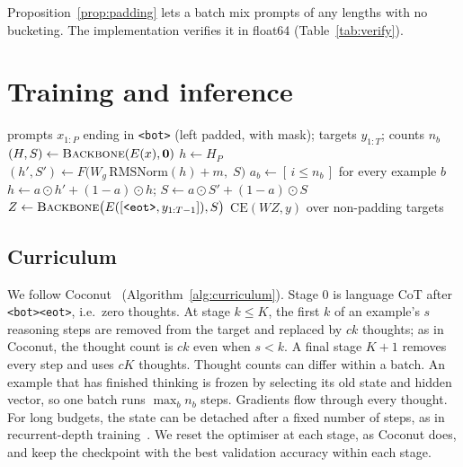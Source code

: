 \documentclass[10pt]{article}
\newcommand{\eot}{\texttt{<eot>}}
\renewcommand{\bot}{\texttt{<bot>}}
\begin{document}
Proposition~\ref{prop:padding} lets a batch mix prompts of any lengths with no bucketing. The implementation verifies it in float64 (Table~\ref{tab:verify}).

\section{Training and inference}

\begin{algorithm}[t]
\caption{Curriculum loss with per-example thought counts}
\label{alg:curriculum}
\begin{algorithmic}[1]
\Require prompts $x_{1:P}$ ending in \bot{} (left padded, with mask); targets $y_{1:T}$; counts $n_b$
\State $(H, S) \gets \textsc{Backbone}(E(x), \mathbf{0})$ 
\State $h \gets H_P$ \Comment{hidden state at \bot}
  \State $(h', S') \gets F\big(W_g\,\mathrm{RMSNorm}(h) + m,\; S\big)$ 
  \State $a_b \gets [\,i \le n_b\,]$ for every example $b$
  \State $h \gets a \odot h' + (1-a)\odot h$; \quad $S \gets a \odot S' + (1-a)\odot S$
\EndFor
\State $Z \gets \textsc{Backbone}\big(E([\eot, y_{1:T-1}]), S\big)$ 
\State \Return $\mathrm{CE}(WZ, y)$ over non-padding targets
\end{algorithmic}
\end{algorithm}

\subsection{Curriculum}

We follow Coconut~\cite{hao2024coconut} (Algorithm~\ref{alg:curriculum}). Stage 0 is language CoT after \bot\eot, i.e.\ zero thoughts. At stage $k \le K$, the first $k$ of an example's $s$ reasoning steps are removed from the target and replaced by $ck$ thoughts; as in Coconut, the thought count is $ck$ even when $s < k$. A final stage $K{+}1$ removes every step and uses $cK$ thoughts. Thought counts can differ within a batch. An example that has finished thinking is frozen by selecting its old state and hidden vector, so one batch runs $\max_b n_b$ steps. Gradients flow through every thought. For long budgets, the state can be detached after a fixed number of steps, as in recurrent-depth training~\cite{geiping2025recurrent}. We reset the optimiser at each stage, as Coconut does, and keep the checkpoint with the best validation accuracy within each stage.
\end{document}

